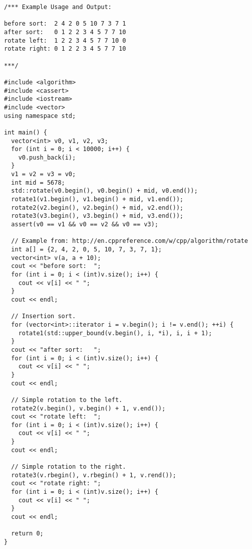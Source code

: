 \begin{lstlisting}
/*** Example Usage and Output:

before sort:  2 4 2 0 5 10 7 3 7 1
after sort:   0 1 2 2 3 4 5 7 7 10
rotate left:  1 2 2 3 4 5 7 7 10 0
rotate right: 0 1 2 2 3 4 5 7 7 10

***/

#include <algorithm>
#include <cassert>
#include <iostream>
#include <vector>
using namespace std;

int main() {
  vector<int> v0, v1, v2, v3;
  for (int i = 0; i < 10000; i++) {
    v0.push_back(i);
  }
  v1 = v2 = v3 = v0;
  int mid = 5678;
  std::rotate(v0.begin(), v0.begin() + mid, v0.end());
  rotate1(v1.begin(), v1.begin() + mid, v1.end());
  rotate2(v2.begin(), v2.begin() + mid, v2.end());
  rotate3(v3.begin(), v3.begin() + mid, v3.end());
  assert(v0 == v1 && v0 == v2 && v0 == v3);

  // Example from: http://en.cppreference.com/w/cpp/algorithm/rotate
  int a[] = {2, 4, 2, 0, 5, 10, 7, 3, 7, 1};
  vector<int> v(a, a + 10);
  cout << "before sort:  ";
  for (int i = 0; i < (int)v.size(); i++) {
    cout << v[i] << " ";
  }
  cout << endl;

  // Insertion sort.
  for (vector<int>::iterator i = v.begin(); i != v.end(); ++i) {
    rotate1(std::upper_bound(v.begin(), i, *i), i, i + 1);
  }
  cout << "after sort:   ";
  for (int i = 0; i < (int)v.size(); i++) {
    cout << v[i] << " ";
  }
  cout << endl;

  // Simple rotation to the left.
  rotate2(v.begin(), v.begin() + 1, v.end());
  cout << "rotate left:  ";
  for (int i = 0; i < (int)v.size(); i++) {
    cout << v[i] << " ";
  }
  cout << endl;

  // Simple rotation to the right.
  rotate3(v.rbegin(), v.rbegin() + 1, v.rend());
  cout << "rotate right: ";
  for (int i = 0; i < (int)v.size(); i++) {
    cout << v[i] << " ";
  }
  cout << endl;

  return 0;
}
\end{lstlisting}
